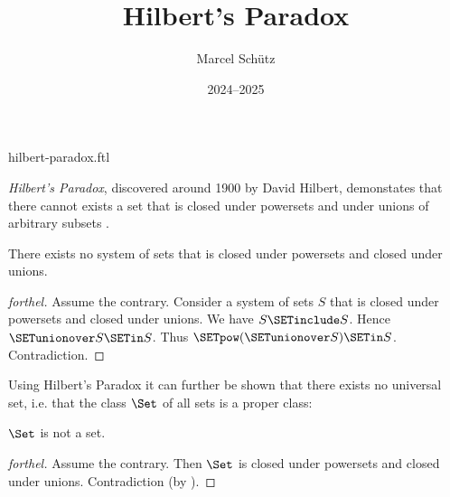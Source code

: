 \documentclass{article}
\title{Hilbert's Paradox}
\author{Marcel Schütz}
\date{2024--2025}
\begin{document}
\begin{smodule}{hilbert-paradox.ftl}
\maketitle


\noindent \emph{Hilbert's Paradox}, discovered around 1900 by David Hilbert, 
demonstates that there cannot exists a set that is closed under powersets and 
under unions of arbitrary subsets \cite{PeckhausKahl2002}.

\begin{theorem}[forthel,title=Hilbert's Paradox,id=hilbert_paradox]
  There exists no system of sets that is closed under powersets and closed under unions.
\end{theorem}
\begin{proof}[forthel]
  Assume the contrary.
  Consider a system of sets $S$ that is closed under powersets and closed under unions.
  We have $S \SETinclude S$.
  Hence $\SETunionover S \SETin S$.
  Thus $\SETpow(\SETunionover S) \SETin S$.
  Contradiction.
\end{proof}

\noindent Using Hilbert's Paradox it can further be shown that there exists 
no universal set, i.e. that the class $\Set$ of all sets is a proper class:

\begin{proposition}[forthel,id=hilbert_paradox_corollary]
  $\Set$ is not a set.
\end{proposition}
\begin{proof}[forthel]
  Assume the contrary.
  Then $\Set$ is closed under powersets and closed under unions.
  Contradiction (by ).
\end{proof}

\printbibliography
{}
\end{smodule}
\end{document}
